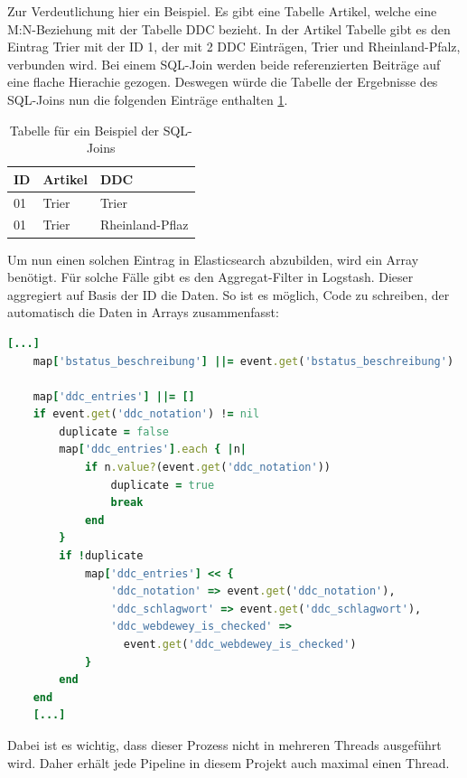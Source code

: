 Zur Verdeutlichung hier ein Beispiel.
Es gibt eine Tabelle Artikel, welche eine M:N-Beziehung mit der Tabelle DDC bezieht. In der Artikel Tabelle gibt es den Eintrag Trier mit der ID 1, der mit 2 DDC Einträgen, Trier und Rheinland-Pfalz, verbunden wird. Bei einem SQL-Join werden beide referenzierten Beiträge auf eine flache Hierachie gezogen. Deswegen würde die Tabelle der Ergebnisse des SQL-Joins nun die folgenden Einträge enthalten \ref{tbl:join}.

\begin{table} %
	\centering
		\begin{tabular}{l | l | l}
		    \textbf{ID} & \textbf{Artikel} & \textbf{DDC} \\
        \hline
        01 & Trier & Trier \\
        01 & Trier & Rheinland-Pflaz  \\
		\end{tabular}
    \caption{Tabelle für ein Beispiel der SQL-Joins}
    \label{tbl:join}
\end{table}

Um nun einen solchen Eintrag in Elasticsearch abzubilden, wird ein Array benötigt. Für solche Fälle gibt es den Aggregat-Filter in Logstash. Dieser aggregiert auf Basis der ID die Daten. So ist es möglich, Code zu schreiben, der automatisch die Daten in Arrays zusammenfasst:

\begin{lstlisting}[language=Ruby, frame=single, label={lst:fronendConf}, caption=Auschnitt aus dem Aggregat-Filter von Logstash,captionpos=b] 
    [...]
    map['bstatus_beschreibung'] ||= event.get('bstatus_beschreibung')
    
    map['ddc_entries'] ||= []
    if event.get('ddc_notation') != nil
        duplicate = false
        map['ddc_entries'].each { |n|
            if n.value?(event.get('ddc_notation'))
                duplicate = true
                break
            end
        }
        if !duplicate
            map['ddc_entries'] << {
                'ddc_notation' => event.get('ddc_notation'),
                'ddc_schlagwort' => event.get('ddc_schlagwort'),
                'ddc_webdewey_is_checked' => 
                  event.get('ddc_webdewey_is_checked')
            }
        end
    end
    [...]
    \end{lstlisting}

Dabei ist es wichtig, dass dieser Prozess nicht in mehreren Threads ausgeführt wird. Daher erhält jede Pipeline in diesem Projekt auch maximal einen Thread.

